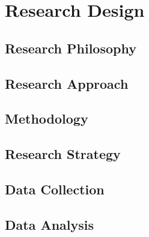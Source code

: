 \chapter{Research Design}\label{chap:research-method}

\section{Research Philosophy}\label{sec:research-philosophy}
%
\section{Research Approach}\label{sec:research-approach}
%
\section{Methodology}\label{sec:methodology}
%
\section{Research Strategy}\label{sec:research-strategy}
%
\section{Data Collection}\label{sec:data-collection}
%
\section{Data Analysis}\label{sec:data-analysis}